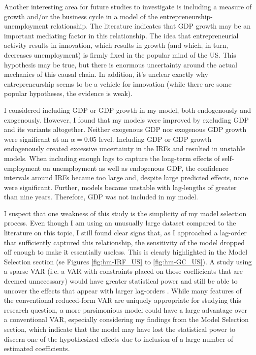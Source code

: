 \documentclass[]{ecca}
\begin{document}
Another interesting area for future studies to investigate is including a measure of growth and/or the business cycle in a model of the entrepreneurship-unemployment relationship. The literature indicates that GDP growth may be an important mediating factor in this relationship. The idea that entrepreneurial activity results in innovation, which results in growth (and which, in turn, decreases unemployment) is firmly fixed in the popular mind of the US. This hypothesis may be true, but there is enormous uncertainty around the actual mechanics of this causal chain. In addition, it's unclear exactly why entrepreneurship seems to be a vehicle for innovation (while there are some popular hypotheses, the evidence is weak). 	

I considered including GDP or GDP growth in my model, both endogenously and exogenously.  However, I found that my models were improved by excluding GDP and its variants altogether. Neither exogenous GDP nor exogenous GDP growth were significant at an $\alpha = 0.05$ level. Including GDP or GDP growth endogenously created excessive uncertainty in the IRFs and resulted in unstable models. When including enough lags to capture the long-term effects of self-employment on unemployment as well as endogenous GDP, the confidence intervals around IRFs became too large and, despite large predicted effects, none were significant. Further, models became unstable with lag-lengths of greater than nine years. Therefore, GDP was not included in my model.

I suspect that one weakness of this study is the simplicity of my model selection process. Even though I am using an unusually large dataset compared to the literature on this topic, I still found clear signs that, as I approached a lag-order that sufficiently captured this relationship, the sensitivity of the model dropped off enough to make it essentially useless. This is clearly highlighted in the Model Selection section (se Figures \ref{fig:hm-IRF_US} to \ref{fig:hm-GC_US}). A study using a sparse VAR (i.e. a VAR with constraints placed on those coefficients that are deemed unnecessary) would have greater statistical power and still be able to uncover the effects that appear with larger lag-orders \citep{sparse}. While many features of the conventional reduced-form VAR are uniquely appropriate for studying this research question, a more parsimonious model could have a large advantage over a conventional VAR, especially considering my findings from the Model Selection section, which indicate that the model may have lost the statistical power to discern one of the hypothesized effects due to inclusion of a large number of estimated coefficients.
\end{document}
